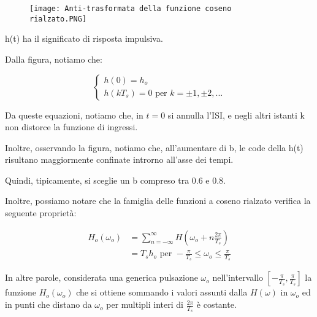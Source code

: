 \begin{figure}[h]
    \centering
    \texttt{[image: Anti-trasformata della funzione coseno rialzato.PNG]}
\end{figure}

h(t) ha il significato di risposta impulsiva. \newline 

Dalla figura, notiamo che: 

{
    \Large 
    \begin{equation}
        \begin{cases}
            h(0) = h_o \\ 
            h(k T_s) = 0 \text{ per } k = \pm 1, \pm 2, ...
        \end{cases}
    \end{equation}
}

Da queste equazioni, notiamo che, in $t=0$ si annulla l'ISI, e negli altri istanti k non distorce la funzione di ingressi. \newline 

Inoltre, osservando la figura, notiamo che, all'aumentare di b, le code della h(t) risultano maggiormente confinate introrno all'asse dei tempi. \newline 

Quindi, tipicamente, si sceglie un b compreso tra 0.6 e 0.8. \newline 

Inoltre, possiamo notare che la famiglia delle funzioni a coseno rialzato verifica la seguente proprietà: 

{
    \Large 
    \begin{equation}
        \begin{split}
            H_o (\omega_o) 
            &= 
            \sum_{n = -\infty}^{\infty}
            H (\omega_o + n \frac{2 \pi}{T_s})
            \\ 
            &= 
            T_s h_o 
            \text{ per }
            -\frac{\pi}{T_s} \leq \omega_o \leq \frac{\pi}{T_s} 
        \end{split}
    \end{equation}
}

In altre parole, considerata una generica pulsazione $\omega_o$ nell'intervallo $[- \frac{\pi}{T_s}, \frac{\pi}{T_s}]$
la funzione $H_o (\omega_o)$ che si ottiene sommando i valori assunti dalla $H(\omega)$ in $\omega_o$ ed in punti che distano da $\omega_o$ per multipli interi 
di $\frac{2 \pi}{T_s}$ è costante.\newline 

